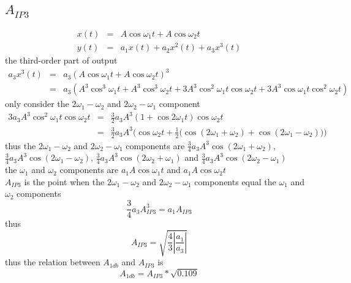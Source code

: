 \documentclass[12pt,a4paper]{article}
\begin{document}
\subsection*{$A_{IP3}$}
\begin{eqnarray*}
x(t)&=&A\cos{\omega_1{t}}+A\cos{\omega_2{t}}\\
y(t)&=&a_1x(t)+a_2x^2(t)+a_3x^3(t)
\end{eqnarray*}
the third-order part of output
\begin{eqnarray*}
a_3x^3(t)&=&a_3(A\cos{\omega_1{t}}+A\cos{\omega_2{t}})^3\\
&=&a_3(A^3\cos^3{\omega_1{t}}+A^3\cos^3{\omega_2{t}}+3A^3\cos^2{\omega_1{t}}\cos{\omega_2{t}}+3A^3\cos{\omega_1{t}}\cos^2{\omega_2{t}})
\end{eqnarray*}
only consider the $2\omega_1-\omega_2$ and $2\omega_2-\omega_1$ component 
\begin{eqnarray*}
3a_3A^3\cos^2{\omega_1{t}}\cos{\omega_2{t}}&=&\frac{3}{2}a_3A^3(1+\cos{2\omega_1{t}})\cos{\omega_2{t}}\\
&=&\frac{3}{2}a_3A^3(\cos{\omega_2{t}}+\frac{1}{2}(\cos{(2\omega_1+\omega_2)}+\cos{(2\omega_1-\omega_2)))}
\end{eqnarray*}
thus the $2\omega_1-\omega_2$ and $2\omega_2-\omega_1$ components are $\frac{3}{4}a_3A^3\cos{(2\omega_1+\omega_2)}$,  $\frac{3}{4}a_3A^3\cos{(2\omega_1-\omega_2)}$,  $\frac{3}{4}a_3A^3\cos{(2\omega_2+\omega_1)}$ and  $\frac{3}{4}a_3A^3\cos{(2\omega_2-\omega_1)}$\\
\newline
the $\omega_1$ and $\omega_2$ components are $a_1A\cos{\omega_1{t}}$ and $a_1A\cos{\omega_2{t}}$ \\
\newline
$A_{IP3}$ is the point when the $2\omega_1-\omega_2$ and $2\omega_2-\omega_1$ components equal the $\omega_1$ and $\omega_2$ components
\begin{equation}
\frac{3}{4}a_3A_{IP3}^3=a_1A_{IP3}
\end{equation}
thus
\begin{equation}
A_{IP3}=\sqrt{\frac{4}{3}\left\vert{\frac{a_1}{a_3}}\right\vert}
\end{equation}
thus the relation between $A_{1db}$ and $A_{IP3}$ is
\begin{equation}
A_{1db}=A_{IP3}*\sqrt{0.109}
\end{equation}
\end{document}
